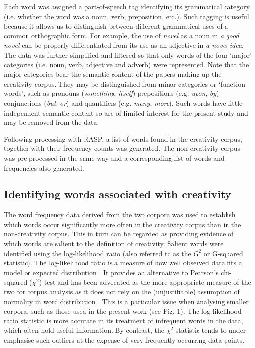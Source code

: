 \documentclass[10pt,letterpaper]{article}
\begin{document}
Each word was assigned a part-of-speech tag identifying its grammatical category (i.e. whether the word was a noun, verb, preposition, etc.). Such tagging is useful because it allows us to distinguish between different grammatical uses of a common orthographic form. For example, the use of {\em novel\/} as a noun in {\em a good novel\/} can be properly differentiated from its use as an adjective in {\em a novel idea\/}.  The data was further simplified and filtered so that only words of the four `major' categories (i.e. noun, verb, adjective and adverb) were represented. Note that the major categories bear the semantic content of the papers making up the creativity corpus. They may be distinguished from minor categories or `function words', such as pronouns ({\em something\/}, {\em itself\/}) prepositions (e.g. {\em upon\/}, {\em by\/}) conjunctions ({\em but\/}, {\em or\/}) and quantifiers (e.g. {\em many\/}, {\em more\/}). Such words have little independent semantic content so are of limited interest for the present study and may be removed from the data.  

Following processing with RASP, a list of words found in the creativity corpus, together with their frequency counts was generated. The non-creativity corpus was pre-processed in the same way and a corresponding list of words and frequencies also generated. 


\subsection*{Identifying words associated with creativity}

The word frequency data derived from the two corpora was used to establish which words occur significantly more often in the creativity corpus than in the non-creativity corpus. This in turn can be regarded as providing evidence of which words are salient to the definition of creativity. Salient words were identified using the log-likelihood ratio  (also referred to as the $G^2$ or G-squared statistic). The log-likelihood ratio is a measure of how well observed data fits a model or expected distribution \cite{dunning93,kilgarriff01,rayson00,oakes98}. It provides an alternative to Pearson's chi-squared ($\chi^2$) test and has been advocated as the more appropriate measure of the two for corpus analysis as it does not rely on the (unjustifiable) assumption of normality in word distribution  \cite{dunning93,kilgarriff01,oakes98}. This is a particular issue when analysing smaller corpora, such as those used in the present work (see Fig. 1). %
The log likelihood ratio statistic is more accurate in its treatment of infrequent words in the data,  which often hold useful information. By contrast, the $\chi^2$ statistic tends to under-emphasise such outliers at the expense of very frequently occurring data points.
\end{document}
